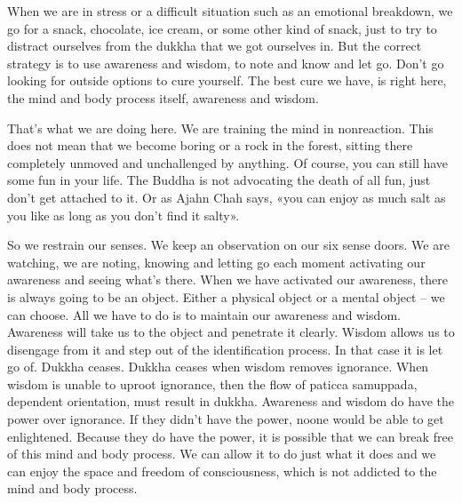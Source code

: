 \documentclass[letterpaper,10pt,english]{sphinxmanual}
\begin{document}
\sphinxAtStartPar
When  we  are  in  stress  or  a  difficult  situation  such  as  an  emotional
break\sphinxhyphen{}down, we go for a snack, chocolate, ice cream, or some other kind of
snack, just to try to distract ourselves from the dukkha that we got ourselves
in.  But  the  correct  strategy  is  to  use  awareness  and  wisdom,  to  note  and
know and let go. Don’t go looking for outside options to cure yourself. The
best cure we have, is right here, the mind and body process itself, awareness
  and wisdom.

\sphinxAtStartPar
{}
That’s what we are doing here. We are training the mind in
non\sphinxhyphen{}reaction. This  does  not  mean  that  we  become  boring  or  a  rock  in  the
forest, sitting there completely unmoved and unchallenged by anything. Of
course, you can still have some fun in your life. The Buddha is not advocating the death of all fun, just don’t get attached to it. Or as Ajahn Chah says,
«you can enjoy as much salt as you like as long as you don’t find it salty».

\sphinxAtStartPar
So  we  restrain  our  senses. We  keep  an  observation  on  our  six  sense
doors. We are watching, we are noting, knowing and letting go each moment
activating our awareness and seeing what’s there. When we have activated
our awareness, there is always going to be an object. Either a physical object
or  a  mental  object  –  we  can  choose. All  we  have  to  do  is  to  maintain  our
awareness and wisdom. Awareness will take us to the object and penetrate it
clearly. Wisdom allows us to disengage from it and step out of the identification process. In that case it is let go of. Dukkha ceases. Dukkha ceases when
wisdom  removes  ignorance. When  wisdom  is  unable  to  uproot  ignorance,
then  the  flow  of  paticca  samuppada,  dependent  orientation,  must  result  in
dukkha. Awareness and wisdom do have the power over ignorance. If they
didn’t  have  the  power,  no\sphinxhyphen{}one  would  be  able  to  get  enlightened.  Because
they do have the power, it is possible that we can break free of this mind and
body process. We can allow it to do just what it does and we can enjoy the
space and freedom of consciousness, which is not addicted to the mind and
body process.

\sphinxstepscope
\end{document}

